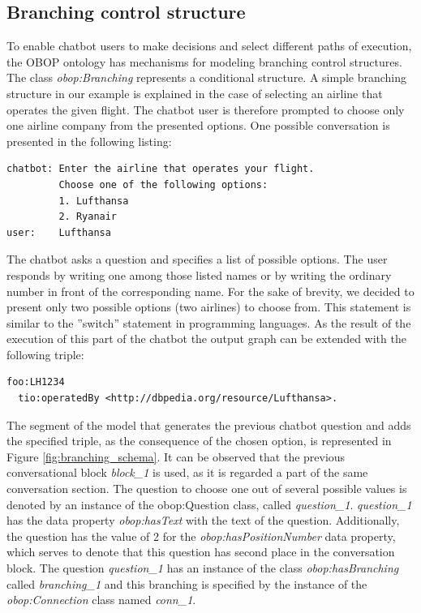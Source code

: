 \documentclass[runningheads]{llncs}
\begin{document}
\subsection{Branching control structure}
To enable chatbot users to make decisions and select different paths of execution, the OBOP ontology has mechanisms for modeling branching control structures. The class \textit{obop:Branching} represents a conditional structure. A simple branching structure in our example is explained in the case of selecting an airline that operates the given flight. The chatbot user is therefore prompted to choose only one airline company from the presented options.  
One possible conversation is presented in the following listing:
\begin{lstlisting}[basicstyle=\small,  xleftmargin=0.7cm ]
chatbot: Enter the airline that operates your flight.
         Choose one of the following options:
         1. Lufthansa
         2. Ryanair
user:    Lufthansa 
\end{lstlisting}
The chatbot asks a question and specifies a list of possible options. The user responds by writing one among those listed names or by writing the ordinary number in front of the corresponding name. For the sake of brevity, we decided to present only two possible options (two airlines) to choose from. This statement is similar to the ''switch'' statement in programming languages. As the result of the execution of this part of the chatbot the output graph can be extended with the following triple:
\begin{lstlisting}[basicstyle=\small,  xleftmargin=0.7cm ]
foo:LH1234
  tio:operatedBy <http://dbpedia.org/resource/Lufthansa>.
\end{lstlisting}
The segment of the model that generates the previous chatbot question and adds the specified triple, as the consequence of the chosen option, is represented in Figure \ref{fig:branching_schema}. It can be observed that the previous conversational block \textit{block\_1} is used, as it is regarded a part of the same conversation section. The question to choose one out of several possible values is denoted by an instance of the obop:Question class, called \textit{question\_1}. \textit{question\_1} has the data property \textit{obop:hasText} with the text of the question. Additionally, the question has the value of 2 for the \textit{obop:hasPositionNumber} data property, which serves to denote that this question has second place in the conversation block.         
The question \textit{question\_1} has an instance of the class \textit{obop:hasBranching} called \textit{branching\_1} and this branching is specified by the instance of the \textit{obop:Connection} class named \textit{conn\_1}.
\end{document}

